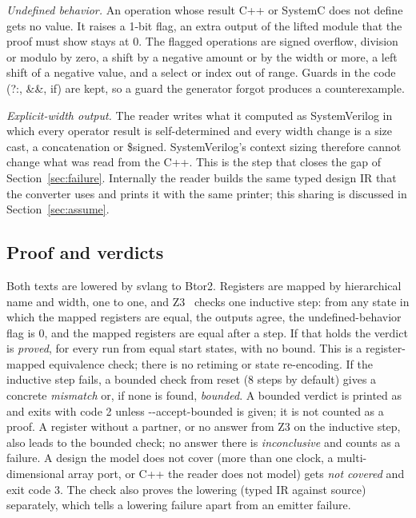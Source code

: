 \documentclass{ieeeaccess}
\newcommand{\code}[1]{{\fontshape{n}\ttfamily #1}}
\begin{document}
\emph{Undefined behavior.} An operation whose result C++ or SystemC does not define gets no value.
It raises a 1-bit flag, an extra output of the lifted module that the proof must show stays at 0.
The flagged operations are signed overflow, division or modulo by zero, a shift by a negative
amount or by the width or more, a left shift of a negative value, and a select or index out of
range. Guards in the code (\code{?:}, \code{\&\&}, \code{if}) are kept, so a guard the generator
forgot produces a counterexample.

\emph{Explicit-width output.} The reader writes what it computed as SystemVerilog in which every
operator result is self-determined and every width change is a size cast, a concatenation or
\code{\$signed}. SystemVerilog's context sizing therefore cannot change what was read from the C++.
This is the step that closes the gap of Section~\ref{sec:failure}. Internally the reader builds the
same typed design IR that the converter uses and prints it with the same printer; this sharing is
discussed in Section~\ref{sec:assume}.

\subsection{Proof and verdicts}

Both texts are lowered by \code{svlang} to Btor2. Registers are mapped by hierarchical name and
width, one to one, and Z3~\cite{demoura2008z3} checks one inductive step: from any state in which
the mapped registers are equal, the outputs agree, the undefined-behavior flag is 0, and the mapped
registers are equal after a step. If that holds the verdict is \emph{proved}, for every run from
equal start states, with no bound. This is a register-mapped equivalence check; there is no
retiming or state re-encoding. If the inductive step fails, a bounded check from reset (8 steps by
default) gives a concrete \emph{mismatch} or, if none is found, \emph{bounded}. A bounded verdict
is printed as \code{[BND]} and exits with code 2 unless \code{-{}-accept-bounded} is given;
it is not counted as a proof. A register without a partner, or no answer from Z3 on the inductive step, also leads to the bounded check; no answer there is \emph{inconclusive} and counts as a failure. A design
the model does not cover (more than one clock, a multi-dimensional array port, or C++ the reader
does not model) gets \emph{not covered} and exit code 3. The check also proves the lowering (typed
IR against source) separately, which tells a lowering failure apart from an emitter failure.
\end{document}

